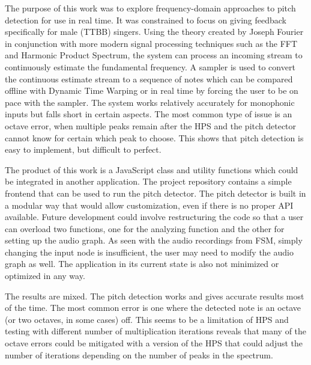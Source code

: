 The purpose of this work was to explore frequency-domain approaches to pitch detection for use in real time. It was constrained to focus on giving feedback specifically for male (TTBB) singers. Using the theory created by Joseph Fourier in conjunction with more modern signal processing techniques such as the FFT and Harmonic Product Spectrum, the system can process an incoming stream to continuously estimate the fundamental frequency. A sampler is used to convert the continuous estimate stream to a sequence of notes which can be compared offline with Dynamic Time Warping or in real time by forcing the user to be on pace with the sampler. The system works relatively accurately for monophonic inputs but falls short in certain aspects. The most common type of issue is an octave error, when multiple peaks remain after the HPS and the pitch detector cannot know for certain which peak to choose. This shows that pitch detection is easy to implement, but difficult to perfect. 

The product of this work is a JavaScript class and utility functions which could be integrated in another application. The project repository contains a simple frontend that can be used to run the pitch detector. The pitch detector is built in a modular way that would allow customization, even if there is no proper API available. Future development could involve restructuring the code so that a user can overload two functions, one for the analyzing function and the other for setting up the audio graph. As seen with the audio recordings from FSM, simply changing the input node is insufficient, the user may need to modify the audio graph as well. The application in its current state is also not minimized or optimized in any way.

The results are mixed. The pitch detection works and gives accurate results most of the time. The most common error is one where the detected note is an octave (or two octaves, in some cases) off. This seems to be a limitation of HPS and testing with different number of multiplication iterations reveals that many of the octave errors could be mitigated with a version of the HPS that could adjust the number of iterations depending on the number of peaks in the spectrum.
